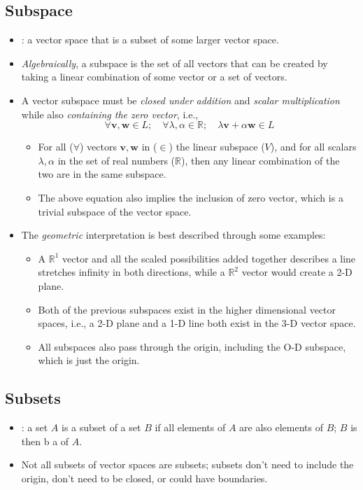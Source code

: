 \begin{itemize}
  \subsection{Subspace}\label{Subspace}
  \begin{itemize}
    \item {}: a vector space that is a subset of some larger vector space.
    \item \emph{Algebraically}, a subspace is the set of all vectors that can be created by taking a linear combination of some vector or a set of vectors.
    \item A vector subspace must be \emph{closed under} \emph{addition} and \emph{scalar multiplication} while also \emph{containing the zero vector}, i.e.,
    \[%
    \forall\bm{v}, \bm{w} \in L;\quad \forall\lambda,\alpha \in \mathbb{R};\quad \lambda \bm{v} + \alpha \bm{w} \in L
    \]%
    \begin{itemize}
      \item For all (\(\forall \)) vectors \(\bm{v},\bm{w}\) in (\(\in \)) the linear subspace (\(V\)), and for all scalars \(\lambda,\alpha \) in the set of real numbers (\(\mathbb{R}\)), then any linear combination of the two are in the same subspace.
      \item The above equation also implies the inclusion of zero vector, which is a trivial subspace of the vector space.
    \end{itemize}
    \item The \emph{geometric} interpretation is best described through some examples:
    \begin{itemize}
      \item A \(\mathbb{R}^1\) vector and all the scaled possibilities added together describes a line stretches infinity in both directions, while a \(\mathbb{R}^2\) vector would create a 2-D plane. 
      \item Both of the previous subspaces exist in the higher dimensional vector spaces, i.e., a 2-D plane and a 1-D line both exist in the 3-D vector space.
      \item All subspaces also pass through the origin, including the O-D subspace, which is just the origin.
    \end{itemize}
  \end{itemize}

  \subsection{Subsets}\label{Subsets}
  \begin{itemize}
    \item {}: a set \(A\) is a subset of a set \(B\) if all elements of \(A\) are also elements of \(B\); \(B\) is then b a  of \(A\).
    \item Not all subsets of vector spaces are subsets; subsets don't need to include the origin, don't need to be closed, or could have boundaries.
  \end{itemize}
  

\end{itemize}

